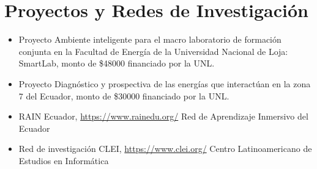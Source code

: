 \documentclass[]{cv-style} %
\begin{document}
\nocite{Gravina2021} \nocite{CalderonOrdonez}
\nocite{Cumbicus-Pineda2019}\nocite{MallaSanchez}\nocite{DarwinGualotuna}\nocite{Ordonez-Ordonez2019}\nocite{Ordonez-Ordonez2019a}\nocite{Ordonez-Ordonez2020}\nocite{pineda2014identificacion}\nocite{RivasEcheverria}

 

\section{Proyectos y Redes de Investigación}
\vspace{-0.3cm}
\begin{itemize}
    \item  \small Proyecto Ambiente inteligente para el macro laboratorio de formación conjunta en la Facultad de Energía de la Universidad Nacional de Loja: SmartLab, monto de \$48000 financiado por la UNL.
    \item \small Proyecto Diagnóstico y prospectiva de las energías que interactúan en la zona 7 del Ecuador, monto de \$30000 financiado por la UNL.
    \item \small RAIN Ecuador, \url{https://www.rainedu.org/} Red de Aprendizaje Inmersivo del Ecuador
    \item \small Red de investigación CLEI, \url{https://www.clei.org/} Centro Latinoamericano de Estudios en Informática
\end{itemize}
\end{document}
